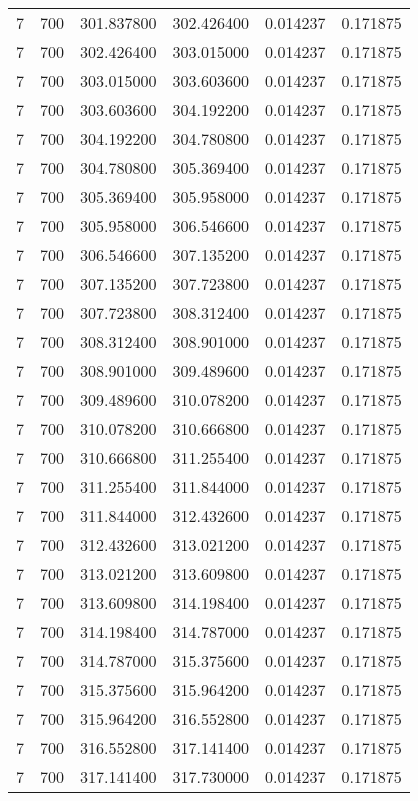 \begin{longtable}{rrrrrr}
7 & 700 & 301.837800 & 302.426400 & 0.014237 & 0.171875 \\
7 & 700 & 302.426400 & 303.015000 & 0.014237 & 0.171875 \\
7 & 700 & 303.015000 & 303.603600 & 0.014237 & 0.171875 \\
7 & 700 & 303.603600 & 304.192200 & 0.014237 & 0.171875 \\
7 & 700 & 304.192200 & 304.780800 & 0.014237 & 0.171875 \\
7 & 700 & 304.780800 & 305.369400 & 0.014237 & 0.171875 \\
7 & 700 & 305.369400 & 305.958000 & 0.014237 & 0.171875 \\
7 & 700 & 305.958000 & 306.546600 & 0.014237 & 0.171875 \\
7 & 700 & 306.546600 & 307.135200 & 0.014237 & 0.171875 \\
7 & 700 & 307.135200 & 307.723800 & 0.014237 & 0.171875 \\
7 & 700 & 307.723800 & 308.312400 & 0.014237 & 0.171875 \\
7 & 700 & 308.312400 & 308.901000 & 0.014237 & 0.171875 \\
7 & 700 & 308.901000 & 309.489600 & 0.014237 & 0.171875 \\
7 & 700 & 309.489600 & 310.078200 & 0.014237 & 0.171875 \\
7 & 700 & 310.078200 & 310.666800 & 0.014237 & 0.171875 \\
7 & 700 & 310.666800 & 311.255400 & 0.014237 & 0.171875 \\
7 & 700 & 311.255400 & 311.844000 & 0.014237 & 0.171875 \\
7 & 700 & 311.844000 & 312.432600 & 0.014237 & 0.171875 \\
7 & 700 & 312.432600 & 313.021200 & 0.014237 & 0.171875 \\
7 & 700 & 313.021200 & 313.609800 & 0.014237 & 0.171875 \\
7 & 700 & 313.609800 & 314.198400 & 0.014237 & 0.171875 \\
7 & 700 & 314.198400 & 314.787000 & 0.014237 & 0.171875 \\
7 & 700 & 314.787000 & 315.375600 & 0.014237 & 0.171875 \\
7 & 700 & 315.375600 & 315.964200 & 0.014237 & 0.171875 \\
7 & 700 & 315.964200 & 316.552800 & 0.014237 & 0.171875 \\
7 & 700 & 316.552800 & 317.141400 & 0.014237 & 0.171875 \\
7 & 700 & 317.141400 & 317.730000 & 0.014237 & 0.171875 \\

\end{longtable}
